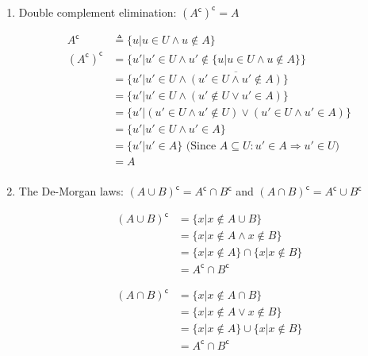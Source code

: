 \documentclass[10pt,\jkfside,a4paper]{article}
\begin{document}
\begin{enumerate}
\begin{enumerate}
\item Double complement elimination: $(A^\mathsf{c})^\mathsf{c} = A$

\begin{equation}
\begin{split}
A^{\mathsf{c}} &\triangleq \{u | u \in U \wedge u \notin A\}\\
(A^{\mathsf{c}})^{\mathsf{c}} &= \{u' | u' \in U \wedge u' \notin \{u | u \in U \wedge u \notin A\}\}\\
							  &= \{u' | u' \in U \wedge \overline{(u' \in U \wedge u' \notin A)}\}\\
							  &= \{u' | u' \in U \wedge (u' \notin U \vee u' \in A)\}\\
							  &= \{u' | (u' \in U \wedge u' \notin U) \vee (u' \in U \wedge u' \in A)\}\\
							  &= \{u' | u' \in U \wedge u' \in A\}\\
							  &= \{u' | u' \in A\} \text{ (Since } A \subseteq U: u' \in A \Longrightarrow u' \in U)\\
							  &= A\\
\end{split}
\end{equation}

\item The De-Morgan laws: $(A \cup B)^\mathsf{c} = A^\mathsf{c} \cap B^\mathsf{c}$ and $(A \cap B)^\mathsf{c} = A^\mathsf{c}\cup B^\mathsf{c}$

\begin{equation}
\begin{split}
(A \cup B)^{\mathsf{c}} &= \{x | x \notin A \cup B\} \\
						&= \{x | x \notin A \wedge x \notin B\}\\
						&= \{x | x \notin A\} \cap \{x | x \notin B\}\\
						&= A^{\mathsf{c}} \cap B^{\mathsf{c}}
\end{split}
\end{equation}

\begin{equation}
\begin{split}
(A \cap B)^{\mathsf{c}} &= \{x | x \notin A \cap B\}\\
						&= \{x | x \notin A \vee x \notin B\}\\
						&= \{x | x \notin A\} \cup \{x | x\notin B\}\\
						&= A^{\mathsf{c}} \cap B^{\mathsf{c}}\\
\end{split}
\end{equation}

\end{enumerate}

\end{enumerate}
\end{document}
